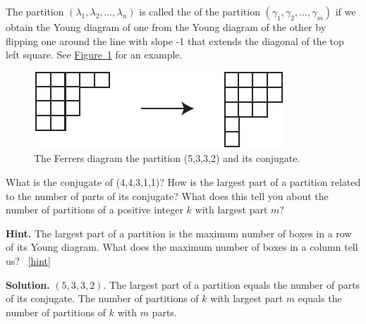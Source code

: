 \documentclass{book}
\begin{document}
\setcounter{project}{304}
\addtocounter{project}{-1}
\begin{activity}[]\label{activity-297}
\hypertarget{p-1530}{}%
The partition \((\lambda_1,\lambda_2,\ldots, \lambda_n)\) is called the  of the partition \((\gamma_1,\gamma_2,\ldots, \gamma_m)\) if we obtain the Young diagram of one from the Young diagram of the other by flipping one around the line with slope -1 that extends the diagonal of the top left square. See \hyperref[conjugateYoung]{Figure~\ref{conjugateYoung}} for an example.%
\begin{figure}
\centering
\includegraphics[width=0.5\linewidth]{images/conjugateYoung}
\caption{The Ferrers diagram the partition (5,3,3,2) and its conjugate.\label{conjugateYoung}}
\end{figure}
\hypertarget{p-1531}{}%
What is the conjugate of (4,4,3,1,1)? How is the largest part of a partition related to the number of parts of its conjugate? What does this tell you about the number of partitions of a positive integer \(k\) with largest part \(m\)?%
\par\smallskip%
\noindent\textbf{Hint.}\hypertarget{hint-190}{}\quad%
\hypertarget{p-1532}{}%
The largest part of a partition is the maximum number of boxes in a row of its Young diagram. What does the maximum number of boxes in a column tell us?%
~\hfill{\tiny\hyperlink{a-304}{[hint]}\hypertarget{q-304}{}}\par\smallskip%
\noindent\textbf{Solution.}\hypertarget{solution-202}{}\quad%
\hypertarget{p-1533}{}%
\((5,3,3,2)\). The largest part of a partition equals the number of parts of its conjugate. The number of partitions of \(k\) with largest part \(m\) equals the number of partitions of \(k\) with \(m\) parts.%
\end{activity}
\end{document}
